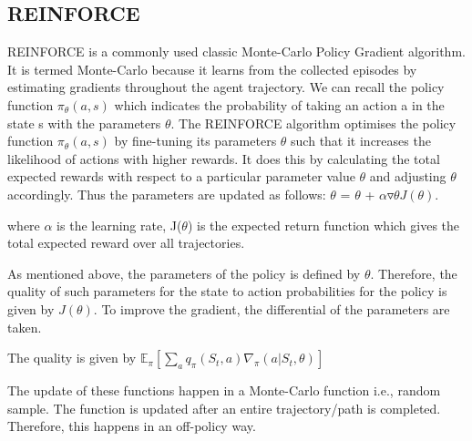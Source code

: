 \documentclass{article}
\begin{document}
\subsection{REINFORCE}
\quad REINFORCE is a commonly used classic Monte-Carlo Policy Gradient algorithm. It is termed Monte-Carlo because it learns from the collected episodes by estimating gradients throughout the agent trajectory. We can recall the policy function  $\pi_{\theta}(a,s)$ which indicates the probability of taking an action a in the state s with the parameters $\theta$.
The REINFORCE algorithm optimises the policy function $\pi_{\theta}(a,s)$ by fine-tuning its parameters $\theta$ such that it increases the likelihood of actions with higher rewards. It does this by calculating the total expected rewards with respect to a particular parameter value $\theta$ and adjusting $\theta$ accordingly. Thus the parameters are updated as follows: 
$\theta$ = $\theta$ + $\alpha$$\triangledown\theta J(\theta)$. %

where $\alpha$ is the learning rate, J($\theta$) is the expected return function which gives the total expected reward over all trajectories. 

As mentioned above, the parameters of the policy is defined by $\theta$. Therefore, the quality of such parameters for the state to action probabilities for the policy is given by $J(\theta)$. To improve the gradient, the differential of the parameters are taken. 

\newline The quality is given by $\mathbb{E}_\pi [ \sum _a q_\pi(S_t, a)\nabla_\pi(a|S_t, \theta)]$

\newline The update of these functions happen in a Monte-Carlo function i.e., random sample. The function is updated after an entire trajectory/path is completed. Therefore, this happens in an off-policy way.  
\end{document}
